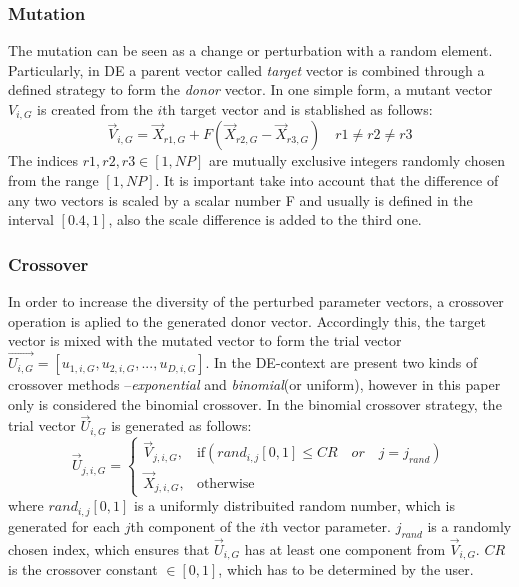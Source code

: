 \subsubsection{Mutation}
The mutation can be seen as a change or perturbation with a random element.
%
Particularly, in DE a parent vector called \textit{target} vector is combined through a defined strategy to form the \textit{donor} vector.
%
In one simple form, a mutant vector $V_{i,G}$ is created from the $i$th target vector and is stablished as follows:
\begin{equation}\label{eqn:mutation}
\vec{V}_{i,G} = \vec{X}_{r1, G} + F(\vec{X}_{r2, G} - \vec{X}_{r3, G}) \quad r1 \neq r2 \neq r3
\end{equation}
%
The indices $r1, r2, r3 \in [1,NP]$ are mutually exclusive integers randomly chosen from the range $[1, NP]$.
%
It is important take into account that the difference of any two vectors is scaled by a scalar number F and usually is defined in the interval $[0.4, 1]$, also the scale difference is added to the third one.
%

\subsubsection{Crossover}

In order to increase the diversity of the perturbed parameter vectors, a crossover operation is aplied to the generated donor vector.
%
Accordingly this, the target vector is mixed with the mutated vector to form the trial vector $\vec{U_{i,G}} = [u_{1,i,G},u_{2,i,G}, ..., u_{D,i,G} ]$.
%
In the DE-context are present two kinds of crossover methods --\textit{exponential} and \textit{binomial}(or uniform), however in this paper only is considered the binomial crossover.
%
In the binomial crossover strategy, the trial vector $\vec{U}_{i,G}$ is generated as follows:
%
\begin{equation} \label{eqn:crossover}
\vec{U}_{j,i,G}= 
\begin{cases}
    \vec{V}_{j,i,G},& \text{if} (rand_{i,j}[0,1] \leq CR \quad or \quad j = j_{rand}  )\\
    \vec{X}_{j,i,G},              & \text{otherwise}
\end{cases}
\end{equation}
where $rand_{i,j}[0,1]$ is a uniformly distribuited random number, which is generated for each $j$th component of the $i$th vector parameter.
%
$j_{rand}$ is a randomly chosen index, which ensures that $\vec{U}_{i,G}$ has at least one component from $\vec{V}_{i,G}$.
%
$CR$ is the crossover constant $\in [0,1]$, which has to be determined by the user.


